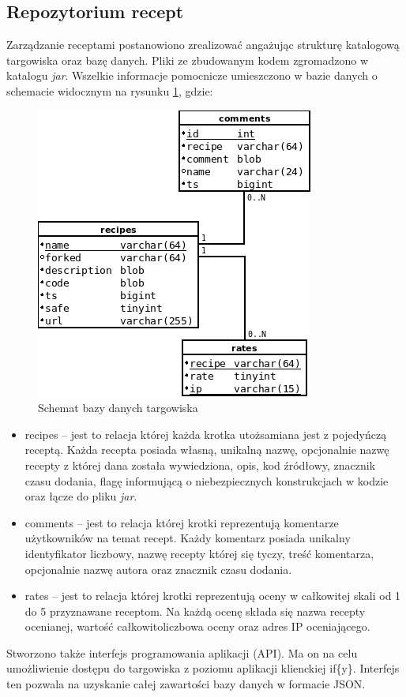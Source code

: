 \documentclass[11pt,a4paper,polish,thesis]{dcsbook}
\begin{document}
\subsection{Repozytorium recept}
Zarządzanie receptami postanowiono zrealizować angażując strukturę katalogową targowiska oraz bazę danych. Pliki ze zbudowanym kodem zgromadzono w katalogu \emph{jar}.
Wszelkie informacje pomocnicze umieszczono w bazie danych o schemacie widocznym na rysunku \ref{fig:market_db}, gdzie:
\begin{figure}[p]
  \centering
  \includegraphics[scale=0.7]{./resources/market_db.png}
  \caption{Schemat bazy danych targowiska}
  \label{fig:market_db}
\end{figure}
\begin{itemize}
\item recipes -- jest to relacja której każda krotka utożsamiana jest z pojedyńczą receptą. Każda recepta posiada własną, unikalną nazwę, opcjonalnie nazwę recepty
z której dana została wywiedziona, opis, kod źródłowy, znacznik czasu dodania, flagę informującą o niebezpiecznych konstrukcjach w kodzie oraz łącze do pliku
\emph{jar}.
\item comments -- jest to relacja której krotki reprezentują komentarze użytkowników na temat recept. Każdy komentarz posiada unikalny identyfikator liczbowy, nazwę
recepty której się tyczy, treść komentarza, opcjonalnie nazwę autora oraz znacznik czasu dodania.
\item rates -- jest to relacja której krotki reprezentują oceny w całkowitej skali od 1 do 5 przyznawane receptom. Na każdą ocenę składa się nazwa recepty ocenianej,
wartość całkowitoliczbowa oceny oraz adres IP oceniającego.
\end{itemize}
Stworzono także interfejs programowania aplikacji (API). Ma on na celu umożliwienie dostępu do targowiska z poziomu aplikacji klienckiej if\{y\}. Interfejs ten
pozwala na uzyskanie całej zawartości bazy danych w formacie JSON.
\end{document}
